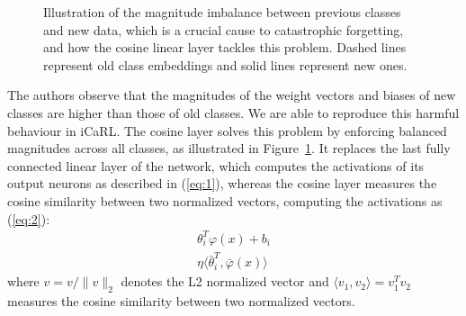 \documentclass[10pt,twocolumn,letterpaper]{article}
\begin{document}
\begin{figure}
\begin{center}
\qquad \qquad
{}
\end{center}
\caption{Illustration of the magnitude imbalance between previous classes and new data, which is a crucial cause to catastrophic forgetting, and how the cosine linear layer tackles this problem. Dashed lines represent old class embeddings and solid lines represent new ones.}
\label{fig:classifier:cosine:features}
\end{figure}

The authors observe that the magnitudes of the weight vectors and biases of new classes are higher than those of old classes. We are able to reproduce this harmful behaviour in iCaRL. The cosine layer solves this problem by enforcing balanced magnitudes across all classes, as illustrated in Figure~\ref{fig:classifier:cosine:features}. It replaces the last fully connected linear layer of the network, which computes the activations of its output neurons as described in (\ref{eq:1}), whereas the cosine layer measures the cosine similarity between two normalized vectors, computing the activations as (\ref{eq:2}):
\begin{align}
    \theta_{i}^{T} \varphi(x) + b_{i} \label{eq:1}\\
    \eta \langle \bar{\theta}_{i}^{T}, \bar{\varphi}(x) \rangle \label{eq:2}
\end{align}
where $v = v/\lVert v \rVert_{2}$ denotes the L2 normalized vector and $\langle v_{1}, v_{2} \rangle = v_{1}^{T} v_{2}$ measures the cosine similarity between two normalized vectors.
\end{document}
